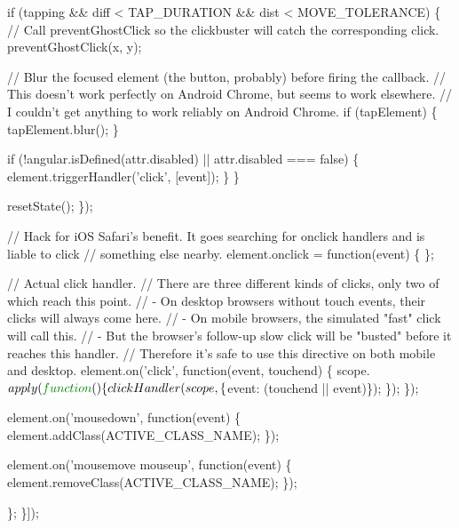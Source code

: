 \begin{DoxyCodeInclude}
      \textcolor{keywordflow}{if} (tapping && diff < TAP\_DURATION && dist < MOVE\_TOLERANCE) \{
        \textcolor{comment}{// Call preventGhostClick so the clickbuster will catch the corresponding click.}
        preventGhostClick(x, y);

        \textcolor{comment}{// Blur the focused element (the button, probably) before firing the callback.}
        \textcolor{comment}{// This doesn't work perfectly on Android Chrome, but seems to work elsewhere.}
        \textcolor{comment}{// I couldn't get anything to work reliably on Android Chrome.}
        \textcolor{keywordflow}{if} (tapElement) \{
          tapElement.blur();
        \}

        \textcolor{keywordflow}{if} (!angular.isDefined(attr.disabled) || attr.disabled === \textcolor{keyword}{false}) \{
          element.triggerHandler(\textcolor{stringliteral}{'click'}, [event]);
        \}
      \}

      resetState();
    \});

    \textcolor{comment}{// Hack for iOS Safari's benefit. It goes searching for onclick handlers and is liable to click}
    \textcolor{comment}{// something else nearby.}
    element.onclick = \textcolor{keyword}{function}(event) \{ \};

    \textcolor{comment}{// Actual click handler.}
    \textcolor{comment}{// There are three different kinds of clicks, only two of which reach this point.}
    \textcolor{comment}{// - On desktop browsers without touch events, their clicks will always come here.}
    \textcolor{comment}{// - On mobile browsers, the simulated "fast" click will call this.}
    \textcolor{comment}{// - But the browser's follow-up slow click will be "busted" before it reaches this handler.}
    \textcolor{comment}{// Therefore it's safe to use this directive on both mobile and desktop.}
    element.on(\textcolor{stringliteral}{'click'}, \textcolor{keyword}{function}(event, touchend) \{
      scope.$apply(\textcolor{keyword}{function}() \{
        clickHandler(scope, \{$event: (touchend || event)\});
      \});
    \});

    element.on(\textcolor{stringliteral}{'mousedown'}, \textcolor{keyword}{function}(event) \{
      element.addClass(ACTIVE\_CLASS\_NAME);
    \});

    element.on(\textcolor{stringliteral}{'mousemove mouseup'}, \textcolor{keyword}{function}(event) \{
      element.removeClass(ACTIVE\_CLASS\_NAME);
    \});

  \};
\}]);


\end{DoxyCodeInclude}
